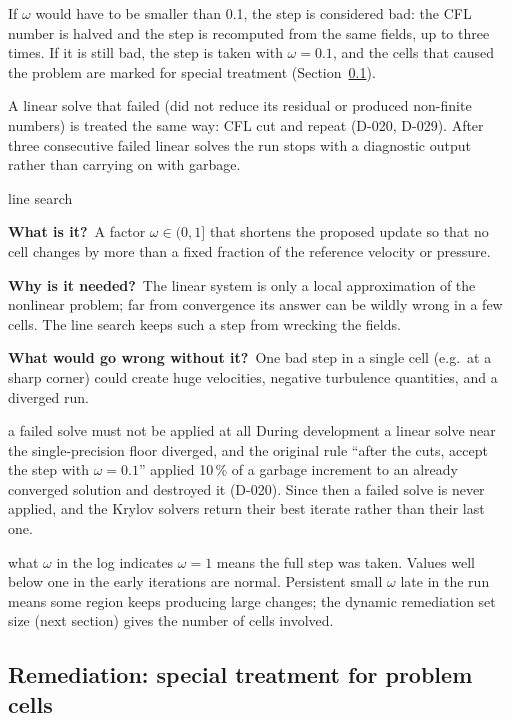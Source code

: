 \documentclass[11pt,a4paper]{article}
\newcommand{\bbwhat}{\par\smallskip\noindent\textbf{What is it?}\ }
\newcommand{\bbwhy}{\par\smallskip\noindent\textbf{Why is it needed?}\ }
\newcommand{\bbwithout}{\par\smallskip\noindent\textbf{What would go wrong
  without it?}\ }
\begin{document}
If $\omega$ would have to be smaller than 0.1, the step is considered bad:
the CFL number is halved and the step is recomputed from the same fields,
up to three times. If it is still bad, the step is taken with $\omega=0.1$,
and the cells that caused the problem are marked for special treatment
(Section~\ref{sec:remediation}).

A linear solve that failed (did not reduce its residual or produced
non-finite numbers) is treated the same way: CFL cut and repeat (D-020,
D-029). After three consecutive failed linear solves the run stops with a
diagnostic output rather than carrying on with garbage.

\begin{bblock}{line search}
\bbwhat A factor $\omega\in(0,1]$ that shortens the proposed update so that
no cell changes by more than a fixed fraction of the reference velocity or
pressure.
\bbwhy The linear system is only a local approximation of the nonlinear
problem; far from convergence its answer can be wildly wrong in a few
cells. The line search keeps such a step from wrecking the fields.
\bbwithout One bad step in a single cell (e.g.\ at a sharp corner) could
create huge velocities, negative turbulence quantities, and a diverged run.
\end{bblock}

\begin{pitfall}{a failed solve must not be applied at all}
  During development a linear solve near the single-precision floor
  diverged, and the original rule ``after the cuts, accept the step with
  $\omega=0.1$'' applied 10\,\% of a garbage increment to an already
  converged solution and destroyed it (D-020). Since then a failed solve is
  never applied, and the Krylov solvers return their best iterate rather
  than their last one.
\end{pitfall}

\begin{whyitmatters}{what $\omega$ in the log indicates}
  $\omega=1$ means the full step was taken. Values well below one in the
  early iterations are normal. Persistent small $\omega$ late in the run
  means some region keeps producing large changes; the dynamic remediation
  set size (next section) gives the number of cells involved.
\end{whyitmatters}

\subsection{Remediation: special treatment for problem cells}\label{sec:remediation}
\end{document}
